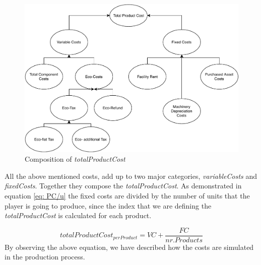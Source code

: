 \begin{figure}[ht]
	\centering
		\includegraphics[scale=0.65]{images/ProductionCosts.pdf}
	\caption{Composition of \textit{totalProductCost}}
	\label{fig:productionCosts}
\end{figure}
All the above mentioned costs, add up to two major categories, \textit{variableCosts} and \textit{fixedCosts}. Together they compose the \textit{totalProductCost}. As demonstrated in equation \ref{eq: PC/u} the fixed costs are divided by the number of units that the player is going to produce, since the index that we are defining the \textit{totalProductCost} is calculated for each product.
 
\begin{equation}
	totalProductCost_{per Product}= VC + \frac{FC}{nr.Products} 
	\label{eq: PC/u}
\end{equation}
By observing the above equation, we have described how the costs are simulated in the production process. 


